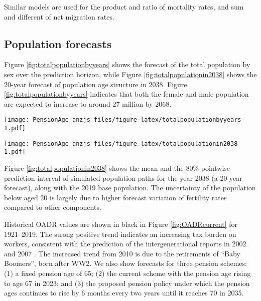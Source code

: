 \documentclass[
  doublespace]{anzsauth}
\let\origfigure\figure
\let\endorigfigure\endfigure
\renewenvironment{figure}[1][2] {
    \expandafter\origfigure\expandafter[tbp]
} {
    \endorigfigure
}
\begin{document}
Similar models are used for the product and ratio of mortality rates, and sum and different of net migration rates.

\hypertarget{population-forecasts}{%
\subsection{Population forecasts}\label{population-forecasts}}

Figure \ref{fig:totalpopulationbyyears} shows the forecast of the total population by sex over the prediction horizon, while Figure \ref{fig:totalpopulationin2038} shows the 20-year forecast of population age structure in 2038. Figure \ref{fig:totalpopulationbyyears} indicates that both the female and male population are expected to increase to around 27 million by 2068.

\begin{figure}
\centering
\texttt{[image: PensionAge\_anzjs\_files/figure-latex/totalpopulationbyyears-1.pdf]}
\caption{\label{fig:totalpopulationbyyears}Fifty-year forecasts of the total population for each sex, along with 80\% prediction intervals.}
\end{figure}

\begin{figure}
\centering
\texttt{[image: PensionAge\_anzjs\_files/figure-latex/totalpopulationin2038-1.pdf]}
\caption{\label{fig:totalpopulationin2038}Forecast population pyramid for 2038, along with 80\% pointwise prediction intervals. The actual pyramid for 2019 is shown using dashed lines.}
\end{figure}

Figure \ref{fig:totalpopulationin2038} shows the mean and the 80\% pointwise prediction interval of simulated population paths for the year 2038 (a 20-year forecast), along with the 2019 base population. The uncertainty of the population below aged 20 is largely due to higher forecast variation of fertility rates compared to other components.

Historical OADR values are shown in black in Figure \ref{fig:OADRcurrent} for 1921--2019. The strong positive trend indicates an increasing tax burden on workers, consistent with the prediction of the intergenerational reports in 2002 \citep{IGR02} and 2007 \citep{IGR07}. The increased trend from 2010 is due to the retirements of ``Baby Boomers'', born after WW2. We also show forecasts for three pension schemes: (1) a fixed pension age of 65; (2) the current scheme with the pension age rising to age 67 in 2023; and (3) the proposed pension policy under which the pension ages continues to rise by 6 months every two years until it reaches 70 in 2035.
\end{document}
